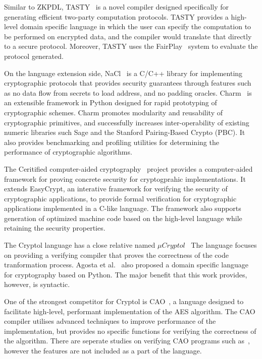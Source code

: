 \documentclass[a4paper, notitlepage]{report}
\begin{document}
Similar to ZKPDL, TASTY~\cite{henecka2010tasty} is a novel compiler
designed specifically for generating efficient two-party computation
protocols. TASTY provides a high-level domain specific language in which
the user can specify the computation to be performed on encrypted data, 
and the compiler would translate that directly to a secure protocol.
Moreover, TASTY uses the FairPlay~\cite{malkhi2004fairplay} system to
evaluate the protocol generated.

On the language extension side,
NaCl~\cite{bernstein2012security} is a C/C++ library for implementing 
cryptographic protocols that 
provides security guarantees through features such as no data flow from 
secrets to load address, and no padding oracles.
Charm~\cite{akinyele2013charm}
is an extensible framework in Python 
designed for rapid prototyping of cryptographic schemes. Charm promotes
modularity and reusability of cryptographic primitives, and successfully 
increases inter-operability of existing numeric libraries such Sage and
the Stanford Pairing-Based Crypto (PBC). It also provides benchmarking
and profiling utilities for determining the performance of cryptographic
algorithms.

The Ceritified computer-aided cryptography~\cite{almeida2013certified} 
project provides a computer-aided framework for proving concrete security for
 cryptogprahic implementations. It extends EasyCrypt, an interative framework
for verifying the security of cryptographic applications, to
provide formal verification for cryptographic applications implemented 
in a C-like language. The framework also supports generation of 
optimized machine code based on the high-level language while
retaining the security properties.

The Cryptol language has a close relative named
${\mu}Cryptol$~\cite{shields2006language,pike2006verifying}
The language focuses on providing a verifying compiler that proves the correctness
of the code tranformation process.
Agosta et al.~\cite{agosta2007domain} also proposed a domain specific language
for cryptography based on Python. The major benefit that this work provides,
however, is syntactic.


One of the strongest competitor for Cryptol is 
CAO~\cite{moss2010bridging}, a language designed to facilitate high-level,
performant implementation of the AES algorithm. The CAO compiler utilises
advanced techniques to improve performance of the implementation, but 
provides no specific functions for verifying the correctness of the algorithm.
There are seperate studies on verifying CAO programs such as~\cite{barbosa2010deductive},
however the features are not included as a part of the language.
\end{document}

